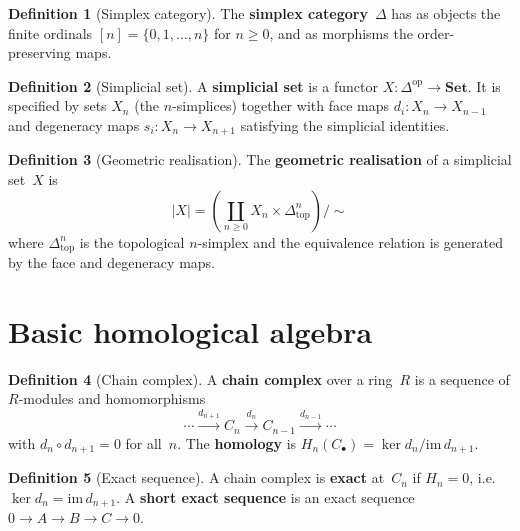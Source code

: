 \documentclass[a4paper,12pt]{book}
\newcommand{\Set}{\mathbf{Set}}
\newcommand{\op}{\mathrm{op}}
\theoremstyle{definition}
\newtheorem{definition}{Definition}[section]
\theoremstyle{plain}
\theoremstyle{remark}
\begin{document}
\begin{definition}[Simplex category]\label{def:app-simplex-cat}
The \textbf{simplex category}~$\Delta$ has as objects the finite
ordinals $[n] = \{0, 1, \ldots, n\}$ for $n\ge 0$, and as morphisms
the order-preserving maps.
\end{definition}

\begin{definition}[Simplicial set]\label{def:app-sset}
A \textbf{simplicial set} is a functor $X\colon\Delta^{\op}\to\Set$.
It is specified by sets $X_n$ (the $n$-simplices) together with
face maps $d_i\colon X_n\to X_{n-1}$ and degeneracy maps
$s_i\colon X_n\to X_{n+1}$ satisfying the simplicial identities.
\end{definition}

\begin{definition}[Geometric realisation]\label{def:app-realisation}
The \textbf{geometric realisation} of a simplicial set~$X$ is
\[
    |X| = \left(\coprod_{n\ge 0} X_n\times\Delta^n_{\mathrm{top}}\right)
    \Big/ {\sim}
\]
where $\Delta^n_{\mathrm{top}}$ is the topological $n$-simplex
and the equivalence relation is generated by the face and degeneracy maps.
\end{definition}


\section{Basic homological algebra}\label{sec:app-homological}

\begin{definition}[Chain complex]\label{def:app-chain-complex}
A \textbf{chain complex} over a ring~$R$ is a sequence of $R$-modules
and homomorphisms
\[
    \cdots \xrightarrow{d_{n+1}} C_n \xrightarrow{d_n} C_{n-1}
    \xrightarrow{d_{n-1}} \cdots
\]
with $d_n\circ d_{n+1} = 0$ for all~$n$.
The \textbf{homology} is $H_n(C_\bullet) = \ker d_n / \mathrm{im}\, d_{n+1}$.
\end{definition}

\begin{definition}[Exact sequence]\label{def:app-exact}
A chain complex is \textbf{exact} at~$C_n$ if $H_n = 0$, i.e.\
$\ker d_n = \mathrm{im}\, d_{n+1}$.  A \textbf{short exact sequence}
is an exact sequence $0\to A\to B\to C\to 0$.
\end{definition}
\end{document}
